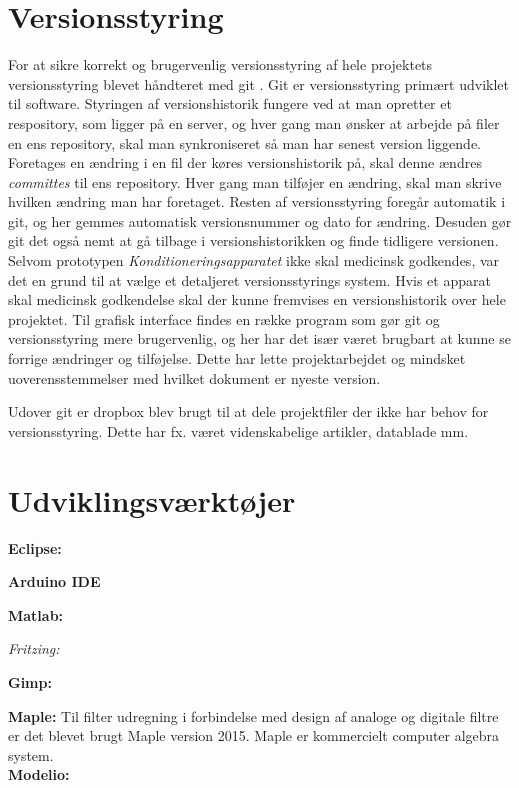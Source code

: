 \section{Versionsstyring}
For at sikre korrekt og brugervenlig versionsstyring af hele projektets versionsstyring blevet håndteret med git . Git er versionsstyring primært udviklet til software. Styringen af versionshistorik fungere ved at man opretter et respository, som ligger på en server, og hver gang man ønsker at arbejde på filer en ens repository, skal man synkroniseret så man har senest version liggende. Foretages en ændring i en fil der køres versionshistorik på, skal denne ændres \textit{committes} til ens repository. Hver gang man tilføjer en ændring, skal man skrive hvilken ændring man har foretaget. Resten af versionsstyring foregår automatik i git, og her gemmes automatisk versionsnummer og dato for ændring. Desuden gør git det også nemt at gå tilbage i versionshistorikken og finde tidligere versionen. 
Selvom prototypen \textit{Konditioneringsapparatet} ikke skal medicinsk godkendes, var det en grund til at vælge et detaljeret versionsstyrings system. Hvis et apparat skal medicinsk godkendelse skal der kunne fremvises en versionshistorik over hele projektet. 
Til grafisk interface findes en række program som gør git og versionsstyring mere brugervenlig, og her har det især været brugbart at kunne se forrige ændringer og tilføjelse. Dette har lette projektarbejdet og mindsket uoverensstemmelser med hvilket dokument er nyeste version. 

Udover git er dropbox blev brugt til at dele projektfiler der ikke har behov for versionsstyring. Dette har fx. været videnskabelige artikler, datablade mm. 

\section{Udviklingsværktøjer}
\textbf{Eclipse:}

\textbf{Arduino IDE}

\textbf{Matlab:}

\textit{Fritzing:}

\textbf{Gimp:} 

\textbf{Maple:} Til filter udregning i forbindelse med design af analoge og digitale filtre er det blevet brugt Maple version 2015. Maple er kommercielt computer algebra system.  \\

\textbf{Modelio:}

